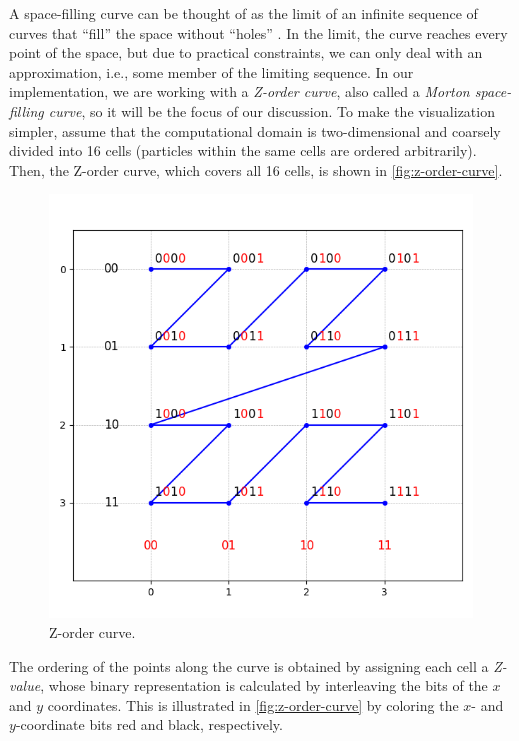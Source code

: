 A space-filling curve can be thought of as the limit of an infinite sequence of curves that ``fill'' the space without ``holes'' \cite{WeissteinPlaneFilling}.
In the limit, the curve reaches every point of the space, but due to practical constraints, we can only deal with an approximation, i.e., some member of the limiting sequence.
In our implementation, we are working with a \textit{Z-order curve}, also called a \textit{Morton space-filling curve}, so it will be the focus of our discussion.
To make the visualization simpler, assume that the computational domain is two-dimensional and coarsely divided into 16 cells (particles within the same cells are ordered arbitrarily).
Then, the Z-order curve, which covers all 16 cells, is shown in \autoref{fig:z-order-curve}.
\begin{figure}[htp]
    \centering
    \includegraphics[scale=0.5]{chapters/barnes-hut/img/z-order.png}
    \caption{Z-order curve.}
    \label{fig:z-order-curve}
\end{figure}
The ordering of the points along the curve is obtained by assigning each cell a \textit{Z-value}, whose binary representation is calculated by interleaving the bits of the $x$ and $y$ coordinates.
This is illustrated in \autoref{fig:z-order-curve} by coloring the $x$- and $y$-coordinate bits red and black, respectively.

